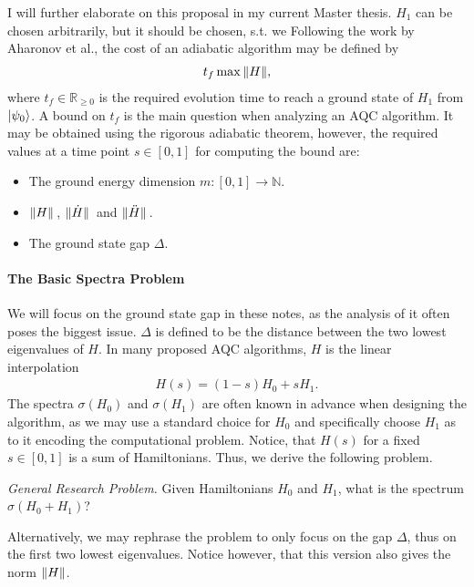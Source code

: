 \documentclass[10pt]{amsart}
\theoremstyle{definition}
\theoremstyle{remark}
\begin{document}
    I will further elaborate on this proposal in my current Master thesis. \(H_1\) can be chosen arbitrarily, but it should be chosen, s.t. we  Following the work by Aharonov et al., the cost of an adiabatic algorithm may be defined by
    \begin{align}
        t_f \max \norm{H},
    \end{align}
    where \(t_f \in \mathbb{R}_{\geq 0}\) is the required evolution time to reach a ground state of \(H_1\) from \(\ket{\psi_0}\). A bound on \(t_f\) is the main question when analyzing an AQC algorithm. It may be obtained using the rigorous adiabatic theorem, however, the required values at a time point \(s \in [0, 1]\) for computing the bound are:
    \begin{itemize}
        \item The ground energy dimension \(m\colon [0, 1] \to \mathbb{N}\).
        \item \(\norm*{H}\), \(\norm*{\dot{H}}\) and \(\norm*{\ddot{H}}\).
        \item The ground state gap \(\Delta\).
    \end{itemize}

    \paragraph*{\textbf{The Basic Spectra Problem}} We will focus on the ground state gap in these notes, as the analysis of it often poses the biggest issue. \(\Delta\) is defined to be the distance between the two lowest eigenvalues of \(H\). In many proposed AQC algorithms, \(H\) is the linear interpolation
    \begin{align}
        H(s) = (1-s)H_0+sH_1.
    \end{align}
    The spectra \(\sigma(H_0)\) and \(\sigma(H_1)\) are often known in advance when designing the algorithm, as we may use a standard choice for \(H_0\) and specifically choose \(H_1\) as to it encoding the computational problem. Notice, that \(H(s)\) for a fixed \(s \in [0, 1]\) is a sum of Hamiltonians. Thus, we derive the following problem.

    \phantom{}

    \emph{General Research Problem.} Given Hamiltonians \(H_0\) and \(H_1\), what is the spectrum \(\sigma(H_0+H_1)\)?

    \phantom{}

    Alternatively, we may rephrase the problem to only focus on the gap \(\Delta\), thus on the first two lowest eigenvalues. Notice however, that this version also gives the norm \(\norm{H}\).
\end{document}
